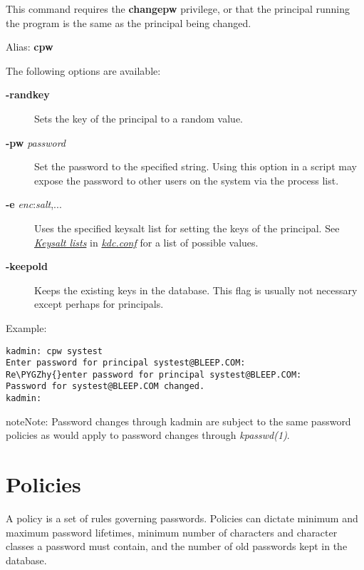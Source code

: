 \documentclass[letterpaper,10pt,english]{sphinxmanual}
\def\PYGZhy{\char`\-}
\begin{document}
This command requires the \textbf{changepw} privilege, or that the
principal running the program is the same as the principal being
changed.

Alias: \textbf{cpw}

The following options are available:
\begin{description}
\item[{\textbf{-randkey}}] \leavevmode
Sets the key of the principal to a random value.

\item[{\textbf{-pw} \emph{password}}] \leavevmode
Set the password to the specified string.  Using this option in a
script may expose the password to other users on the system via
the process list.

\item[{\textbf{-e} \emph{enc}:\emph{salt},...}] \leavevmode
Uses the specified keysalt list for setting the keys of the
principal.  See {\hyperref[admin/conf_files/kdc_conf:keysalt-lists]{\emph{Keysalt lists}}} in {\hyperref[admin/conf_files/kdc_conf:kdc-conf-5]{\emph{kdc.conf}}} for a
list of possible values.

\item[{\textbf{-keepold}}] \leavevmode
Keeps the existing keys in the database.  This flag is usually not
necessary except perhaps for  principals.

\end{description}

Example:

\begin{Verbatim}[commandchars=\\\{\}]
kadmin: cpw systest
Enter password for principal systest@BLEEP.COM:
Re\PYGZhy{}enter password for principal systest@BLEEP.COM:
Password for systest@BLEEP.COM changed.
kadmin:
\end{Verbatim}

\begin{notice}{note}{Note:}
Password changes through kadmin are subject to the same
password policies as would apply to password changes through
\emph{kpasswd(1)}.
\end{notice}


\section{Policies}
\label{admin/database:policies}\label{admin/database:id1}
A policy is a set of rules governing passwords.  Policies can dictate
minimum and maximum password lifetimes, minimum number of characters
and character classes a password must contain, and the number of old
passwords kept in the database.
\end{document}

